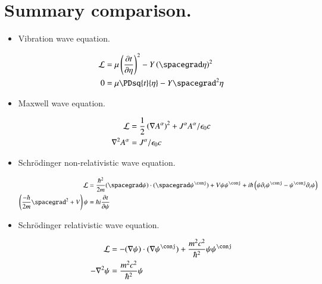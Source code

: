 \documentclass{article}
\begin{document}
\section{ Summary comparison. }

\begin{itemize}

\item Vibration wave equation.

\begin{align*}
\LL &= \mu \left( \PD{t}{\eta} \right)^2 - Y \left( \spacegrad \eta \right)^2 \\
0 &= \mu \PDsq{t}{\eta} - Y \spacegrad^2 {\eta}
\end{align*}

\item Maxwell wave equation.

\begin{align*}
\mathcal{L} &= \frac{1}{2} \left( \nabla {A^\alpha} \right)^2 + J^\alpha A^\alpha / \epsilon_0 c \\
\nabla^2 A^\alpha &= J^\alpha/\epsilon_0 c 
\end{align*}

\item Schr\"{o}dinger non-relativistic wave equation.

\begin{align*}
\LL &= \frac{\hbar^2}{2m}
(\spacegrad \psi) \cdot (\spacegrad \psi^\conj) + V \psi \psi^\conj + {i \hbar} \left( \psi \partial_t \psi^\conj - \psi^\conj \partial_t \psi \right) \\
\left( \frac{-\hbar}{2m} \spacegrad^2 + V \right) \psi &= \hbar i \PD{t}{\psi}
\end{align*}

\item Schr\"{o}dinger relativistic wave equation.

\begin{align*}
\LL &= -(\grad \psi) \cdot (\grad \psi^\conj) + \frac{m^2 c^2}{\hbar^2} \psi \psi^\conj \\
-\grad^2 \psi &= \frac{m^2 c^2}{\hbar^2} \psi
\end{align*}

\end{itemize}



\end{document}
